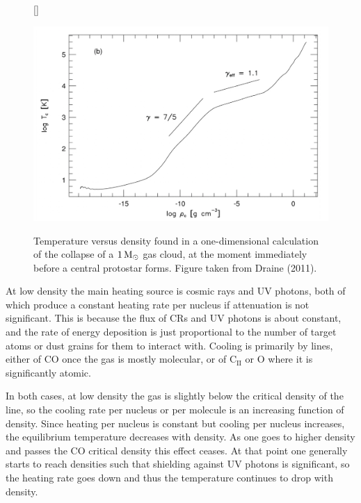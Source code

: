 \documentclass[a4paper,10pt]{article}
\begin{document}
\begin{figure}[t]
    [\FBwidth]
    {\caption{\footnotesize{Temperature versus density found in a one-dimensional calculation of the collapse of a $1\,{\rm M_\odot}$ gas cloud, at the moment immediately before a central protostar forms. Figure taken from Draine (2011).}}
    \label{fig:sf_tvsrho}}
    {\includegraphics[width=12cm]{figures/SF_TvsRho.png}}
\end{figure}

{\noindent}At low density the main heating source is cosmic rays and UV photons, both of which produce a constant heating rate per nucleus if attenuation is not significant. This is because the flux of CRs and UV photons is about constant, and the rate of energy deposition is just proportional to the number of target atoms or dust grains for them to interact with. Cooling is primarily by lines, either of CO once the gas is mostly molecular, or of C$_\mathrm{II}$ or O where it is significantly atomic.

{\noindent}In both cases, at low density the gas is slightly below the critical density of the line, so the cooling rate per nucleus or per molecule is an increasing function of density. Since heating per nucleus is constant but cooling per nucleus increases, the equilibrium temperature decreases with density. As one goes to higher density and passes the CO critical density this effect ceases. At that point one generally starts to reach densities such that shielding against UV photons is significant, so the heating rate goes down and thus the temperature continues to drop with density.
\end{document}
